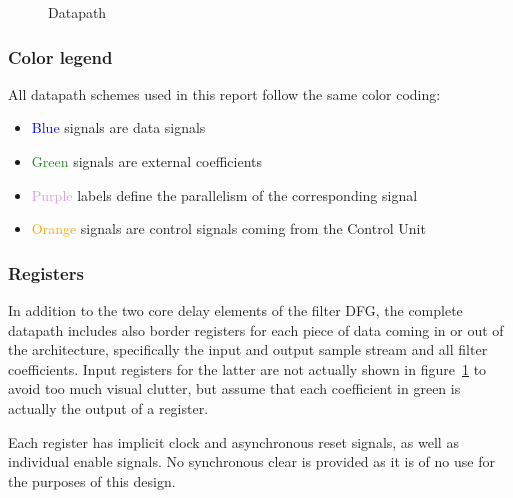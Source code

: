 \documentclass[a4paper]{article}
\begin{document}
\begin{figure}[hbtp]
    \centering
    \caption{Datapath}
    \label{fig:base_dp}
\end{figure}

\subsubsection{Color legend}
All datapath schemes used in this report follow the same color coding:
\begin{itemize}
    \item \textcolor{blue}{Blue} signals are data signals
    \item \textcolor{ForestGreen}{Green} signals are external coefficients
    \item \textcolor{Plum}{Purple} labels define the parallelism of the corresponding signal
    \item \textcolor{orange}{Orange} signals are control signals coming from the Control Unit
\end{itemize}

\subsubsection{Registers}
In addition to the two core delay elements of the filter DFG, the complete datapath includes also border registers for each piece of data coming in or out of the architecture, specifically the input and output sample stream and all filter coefficients. Input registers for the latter are not actually shown in figure~\ref{fig:base_dp} to avoid too much visual clutter, but assume that each coefficient in green is actually the output of a register.

Each register has implicit clock and asynchronous reset signals, as well as individual enable signals. No synchronous clear is provided as it is of no use for the purposes of this design.
\end{document}
